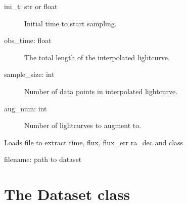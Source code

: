 \documentclass[a4paper,10pt,english]{sphinxmanual}
\begin{document}
\begin{fulllineitems}
\begin{fulllineitems}
\begin{description}
\item[{ini\_t: str or float}] \leavevmode
Initial time to start sampling.

\item[{obs\_time: float}] \leavevmode
The total length of the interpolated lightcurve.

\item[{sample\_size: int}] \leavevmode
Number of data points in interpolated lightcurve.

\item[{aug\_num: int}] \leavevmode
Number of lightcurves to augment to.

\end{description}

\end{fulllineitems}


\begin{fulllineitems}
\label{\detokenize{api:malt.Lightcurve.loadfile}}
Loads file to extract time, flux, flux\_err  ra\_dec and class

filename: path to dataset

\end{fulllineitems}


\end{fulllineitems}



\section{The Dataset class}
\label{\detokenize{api:the-dataset-class}}
\end{document}
